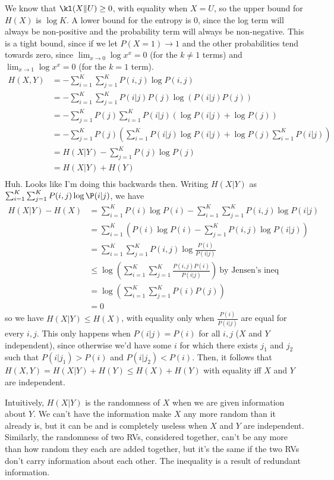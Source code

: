 \documentclass{article}
\begin{document}
We know that $\kl(X\|U)\geq0$, with equality when $X=U$, so the upper bound for $H(X)$ is $\log K$. A lower bound for the entropy is $0$, since the log term will always be non-positive and the probability term will always be non-negative. This is a tight bound, since if we let $P(X=1)\to1$ and the other probabilities tend towards zero, since $\lim_{x\to0}\log x^x=0$ (for the $k\neq1$ terms) and $\lim_{x\to1}\log x^x=0$ (for the $k=1$ term).
\begin{align*}
    H(X,Y)&=-\sum_{i=1}^K\sum_{j=1}^KP(i,j)\log P(i,j)\\
          &=-\sum_{i=1}^K\sum_{j=1}^KP(i|j)P(j)\log \left(P(i|j)P(j)\right)\\
          &=-\sum_{j=1}^KP(j)\sum_{i=1}^KP(i|j)\left(\log P(i|j) + \log P(j)\right)\\
          &=-\sum_{j=1}^KP(j)\left(\sum_{i=1}^KP(i|j)\log P(i|j)+\log P(j)\sum_{i=1}^KP(i|j)\right)\\
          &=H(X|Y)-\sum_{j=1}^KP(j)\log P(j)\\
          &=H(X|Y)+H(Y)\\
\end{align*}
Huh. Looks like I'm doing this backwards then. Writing $H(X|Y)$ as $\sum_{i=1}^K\sum_{j=1}^KP(i,j)\log \P(i|j)$, we have 
\begin{align*}
    H(X|Y)-H(X)&=\sum_{i=1}^KP(i)\log P(i)-\sum_{i=1}^K\sum_{j=1}^KP(i,j)\log P(i|j)\\
               &=\sum_{i=1}^K \left(P(i)\log P(i)-\sum_{j=1}^KP(i,j)\log P(i|j)\right)\\
               &=\sum_{i=1}^K\sum_{j=1}^KP(i,j)\log\frac{P(i)}{P(i|j)}\\
               &\leq\log\left(\sum_{i=1}^K\sum_{j=1}^K\frac{P(i,j)P(i)}{P(i|j)}\right)\ \text{by Jensen's ineq}\\
               &=\log\left(\sum_{i=1}^K\sum_{j=1}^KP(i)P(j)\right)\\
               &=0
\end{align*}
so we have $H(X|Y)\leq H(X)$, with equality only when $\frac{P(i)}{P(i|j)}$ are equal for every $i,j$. This only happens when $P(i|j)=P(i)$ for all $i,j$ ($X$ and $Y$ independent), since otherwise we'd have some $i$ for which there exists $j_1$ and $j_2$ such that $P(i|j_1)>P(i)$ and $P(i|j_2)<P(i)$. Then, it follows that $H(X,Y)=H(X|Y)+H(Y)\leq H(X)+H(Y)$ with equality iff $X$ and $Y$ are independent.

Intuitively, $H(X|Y)$ is the randomness of $X$ when we are given information about $Y$. We can't have the information make $X$ any more random than it already is, but it can be and is completely useless when $X$ and $Y$ are independent. Similarly, the randomness of two RVs, considered together, can't be any more than how random they each are added together, but it's the same if the two RVs don't carry information about each other. The inequality is a result of redundant information.
\end{document}
